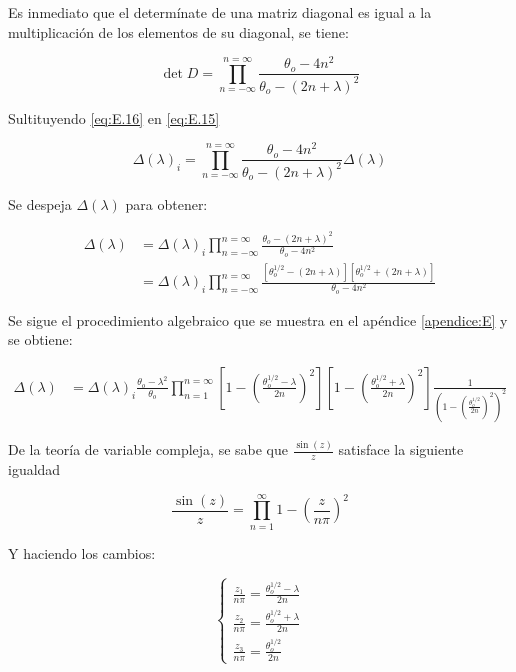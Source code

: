 Es inmediato que el determínate de una matriz diagonal es igual a la multiplicación de los elementos de su diagonal, se tiene:

\begin{equation}\label{eq:E.16}
   \det D= \prod_{n=-\infty}^{n=\infty} \frac{\theta_o-4n^2}{\theta_o-(2n+\lambda)^2}
\end{equation}

Sultituyendo \ref{eq:E.16} en \ref{eq:E.15}

\begin{equation}\label{eq:E.17}
\Delta(\lambda)_{i} = \prod_{n=-\infty}^{n=\infty} \frac{\theta_o-4n^2}{\theta_o-(2n+\lambda)^2} \Delta(\lambda)
\end{equation}

Se despeja $\Delta(\lambda)$ para obtener:

\begin{equation}\label{eq:E.18}
\begin{aligned}
\Delta(\lambda) & =\Delta(\lambda)_{i} \prod_{n=-\infty}^{n=\infty} \frac{\theta_o-(2n+\lambda)^2}{\theta_o-4n^2} \\
& = \Delta(\lambda)_{i} \prod_{n=-\infty}^{n=\infty} \frac{[\theta_o^{1/2}-(2n+\lambda)][\theta_o^{1/2}+(2n+\lambda)]}{\theta_o-4n^2} 
\end{aligned}
\end{equation}

Se sigue el procedimiento algebraico que se muestra en el apéndice \ref{apendice:E} y se obtiene:

\begin{equation}\label{eq:E.20}
\begin{aligned}
\Delta(\lambda) & =\Delta(\lambda)_{i} \frac{\theta_o-\lambda^2}{\theta_o}\prod_{n=1}^{n=\infty} [1-(\frac{\theta_o^{1/2}-\lambda}{2n})^2][1-(\frac{\theta_o^{1/2}+\lambda}{2n})^2]\frac{1}{(1-(\frac{\theta_o^{1/2}}{2n})^2)^2}
\end{aligned}
\end{equation}

De la teoría de variable compleja, se sabe que $\frac{\sin(z)}{z}$  satisface la siguiente igualdad \cite{Philip}

\large
\begin{equation}\label{eq:E.21}
\frac{\sin(z)}{z} = \prod_{n=1}^{\infty} 1-(\frac{z}{n \pi})^2
\end{equation}
\normalsize

Y haciendo los cambios:

\Large
\begin{equation}\label{eq:E.22}
\begin{cases}
\frac{z_1}{n\pi}=\frac{\theta_o^{1/2}-\lambda}{2n}\\
\frac{z_2}{n\pi}=\frac{\theta_o^{1/2}+\lambda}{2n}\\
\frac{z_3}{n\pi}= \frac{\theta_o^{1/2}}{2n}
\end{cases}
\end{equation}
\normalsize

